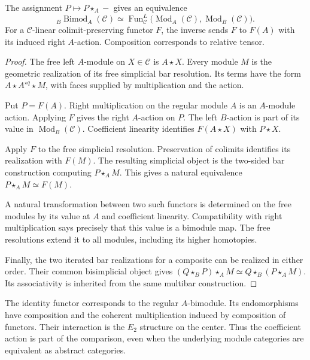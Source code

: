 \begin{theorem}
\label{v4-arith:centers:thm:watts}
The assignment $P\mapsto P\star_A-$ gives an equivalence
\begin{equation}\label{v4-arith:centers:eq:watts}
 {}_B\operatorname{Bimod}_A(\mathcal C)
 \simeq
 \operatorname{Fun}^{L}_{\mathcal C}
 \bigl(\operatorname{Mod}_A(\mathcal C),
       \operatorname{Mod}_B(\mathcal C)\bigr).
\end{equation}
For a $\mathcal C$-linear colimit-preserving functor $F$,
the inverse sends $F$ to $F(A)$ with its induced right
$A$-action. Composition corresponds to relative tensor.
\end{theorem}

\begin{proof}
The free left $A$-module on $X\in\mathcal C$ is
$A\star X$. Every module $M$ is the geometric realization
of its free simplicial bar resolution. Its terms have the
form $A\star A^{\star q}\star M$, with faces supplied by
multiplication and the action.

Put $P=F(A)$. Right multiplication on the regular module
$A$ is an $A$-module action. Applying $F$ gives the right
$A$-action on $P$. The left $B$-action is part of its
value in $\operatorname{Mod}_B(\mathcal C)$.
Coefficient linearity identifies
$F(A\star X)$ with $P\star X$.

Apply $F$ to the free simplicial resolution. Preservation
of colimits identifies its realization with $F(M)$.
The resulting simplicial object is the two-sided bar
construction computing $P\star_A M$. This gives a
natural equivalence $P\star_A M\simeq F(M)$.

A natural transformation between two such functors is
determined on the free modules by its value at $A$ and
coefficient linearity. Compatibility with right
multiplication says precisely that this value is a
bimodule map. The free resolutions extend it to all
modules, including its higher homotopies.

Finally, the two iterated bar realizations for a
composite can be realized in either order. Their common
bisimplicial object gives
$(Q\star_B P)\star_A M\simeq Q\star_B(P\star_A M)$.
Its associativity is inherited from the same multibar
construction.
\end{proof}

The identity functor corresponds to the regular
$A$-bimodule. Its endomorphisms have composition and the
coherent multiplication induced by composition of
functors. Their interaction is the $E_2$ structure on
the center. Thus the coefficient action is part of the
comparison, even when the underlying module categories
are equivalent as abstract categories.

